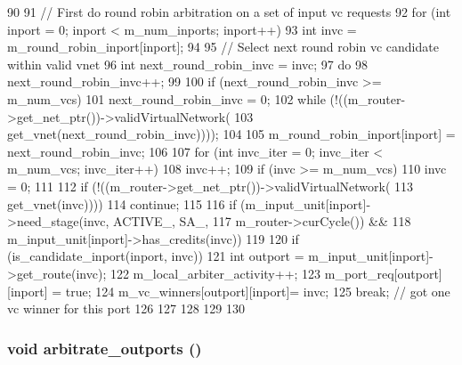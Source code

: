 \begin{DoxyCode}
90 {
91     // First do round robin arbitration on a set of input vc requests
92     for (int inport = 0; inport < m_num_inports; inport++) {
93         int invc = m_round_robin_inport[inport];
94 
95         // Select next round robin vc candidate within valid vnet
96         int next_round_robin_invc = invc;
97         do {
98             next_round_robin_invc++;
99 
100             if (next_round_robin_invc >= m_num_vcs)
101                 next_round_robin_invc = 0;
102         } while (!((m_router->get_net_ptr())->validVirtualNetwork(
103                     get_vnet(next_round_robin_invc))));
104 
105         m_round_robin_inport[inport] = next_round_robin_invc;
106 
107         for (int invc_iter = 0; invc_iter < m_num_vcs; invc_iter++) {
108             invc++;
109             if (invc >= m_num_vcs)
110                 invc = 0;
111 
112             if (!((m_router->get_net_ptr())->validVirtualNetwork(
113                 get_vnet(invc))))
114                 continue;
115 
116             if (m_input_unit[inport]->need_stage(invc, ACTIVE_, SA_,
117                                                  m_router->curCycle()) &&
118                 m_input_unit[inport]->has_credits(invc)) {
119 
120                 if (is_candidate_inport(inport, invc)) {
121                     int outport = m_input_unit[inport]->get_route(invc);
122                     m_local_arbiter_activity++;
123                     m_port_req[outport][inport] = true;
124                     m_vc_winners[outport][inport]= invc;
125                     break; // got one vc winner for this port
126                 }
127             }
128         }
129     }
130 }
\end{DoxyCode}
\hypertarget{classSWallocator__d_a275d37eb2473a7b01f806f9822a09657}{
\subsubsection[{arbitrate\_\-outports}]{\setlength{\rightskip}{0pt plus 5cm}void arbitrate\_\-outports ()}}
\label{classSWallocator__d_a275d37eb2473a7b01f806f9822a09657}



